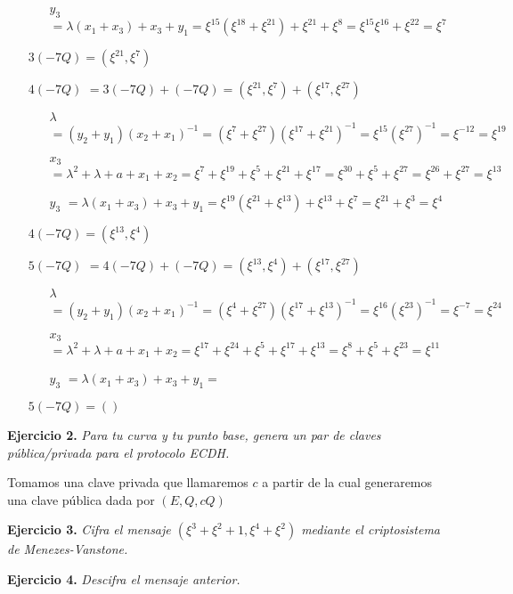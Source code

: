 \documentclass[fleqn]{article}
\begin{document}
\begin{itemize}
\begin{itemize}
                \item[$y_3$] $ = \lambda(x_1 + x_3) + x_3 + y_1 = \xi^{15} (\xi^{18} + \xi^{21}) + \xi^{21} + \xi^{8} = \xi^{15}\xi^{16} + \xi^{22} = \xi^{7}$
            \end{itemize}
            $3(-7Q) = (\xi^{21}, \xi^{7})$
        \item[$4(-7Q)$] $ = 3(-7Q) + (-7Q) = (\xi^{21}, \xi^{7}) + (\xi^{17}, \xi^{27})$
            \begin{itemize}
                \item[$\lambda$] $ = (y_2 + y_1)(x_2 + x_1)^{-1} = (\xi^{7} + \xi^{27}) (\xi^{17} + \xi^{21})^{-1} = \xi^{15} (\xi^{27})^{-1} = \xi^{-12} = \xi^{19}$
                \item[$x_3$] $ = \lambda^2 + \lambda + a + x_1 + x_2 = \xi^{7} + \xi^{19} + \xi^{5} + \xi^{21} + \xi^{17} = \xi^{30} + \xi^{5} + \xi^{27} = \xi^{26} + \xi^{27} = \xi^{13}$
                \item[$y_3$] $ = \lambda(x_1 + x_3) + x_3 + y_1 = \xi^{19} (\xi^{21} + \xi^{13}) + \xi^{13} + \xi^{7} = \xi^{21} + \xi^{3} = \xi^{4}$
            \end{itemize}
            $4(-7Q) = (\xi^{13}, \xi^{4})$
        \item[$5(-7Q)$] $ = 4(-7Q) + (-7Q) = (\xi^{13}, \xi^{4}) + (\xi^{17}, \xi^{27})$
            \begin{itemize}
                \item[$\lambda$] $ = (y_2 + y_1)(x_2 + x_1)^{-1} = (\xi^{4} + \xi^{27}) (\xi^{17} + \xi^{13})^{-1} = \xi^{16} (\xi^{23})^{-1} = \xi^{-7} = \xi^{24}$
                \item[$x_3$] $ = \lambda^2 + \lambda + a + x_1 + x_2 = \xi^{17} + \xi^{24} + \xi^{5} + \xi^{17} + \xi^{13} = \xi^{8} + \xi^{5} + \xi^{23} = \xi^{11}$
                \item[$y_3$] $ = \lambda(x_1 + x_3) + x_3 + y_1 = $
            \end{itemize}
            $5(-7Q) = ()$

    \end{itemize}



    \newpage
    \textbf{Ejercicio 2. }\textit{Para tu curva y tu punto base, genera un par de claves pública/privada para el protocolo ECDH.}
    \vspace{0.5cm}

    Tomamos una clave privada que llamaremos $c$ a partir de la cual generaremos una clave pública dada por $(E, Q, cQ)$


    \newpage
    \textbf{Ejercicio 3. }\textit{Cifra el mensaje $(\xi^3 + \xi^2 + 1, \xi^4 + \xi^2)$ mediante el criptosistema de Menezes-Vanstone.}
    \vspace{0.5cm}


    \newpage
    \textbf{Ejercicio 4. }\textit{Descifra el mensaje anterior.}
\end{document}
